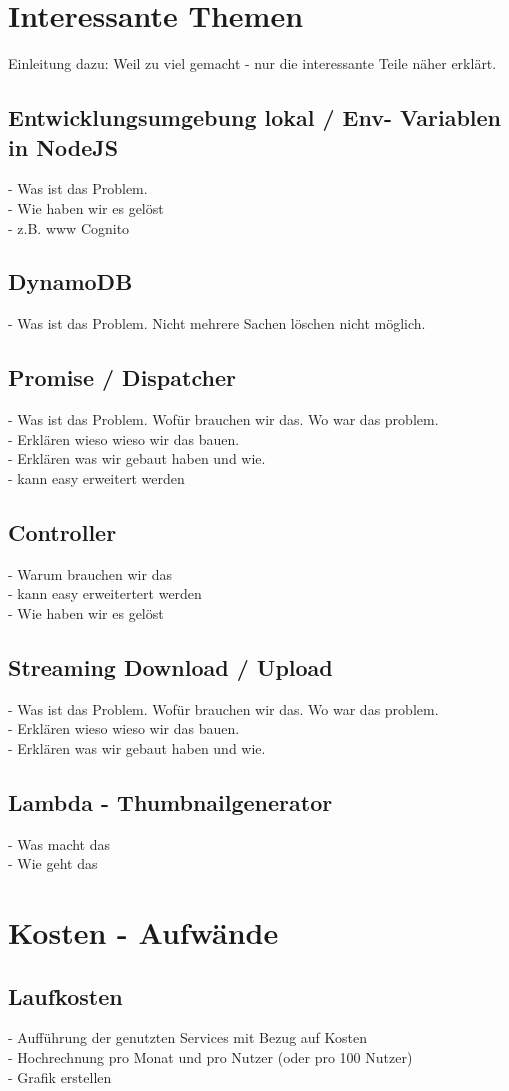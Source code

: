 \documentclass[a4paper, 12pt]{scrreprt}
\begin{document}
\chapter{Interessante Themen}
Einleitung dazu: Weil zu viel gemacht - nur die interessante Teile näher erklärt.

\section{Entwicklungsumgebung lokal / Env- Variablen in NodeJS}
- Was ist das Problem.\\ 
- Wie haben wir es gelöst\\
-  z.B. www Cognito

\section{DynamoDB}
- Was ist das Problem. Nicht mehrere Sachen löschen nicht möglich. 

\section{Promise / Dispatcher}
- Was ist das Problem. Wofür brauchen wir das. Wo war das problem.\\
- Erklären wieso wieso wir das bauen.\\
- Erklären was wir gebaut haben und wie.\\
- kann easy erweitert werden

\section{Controller}
- Warum brauchen wir das\\
- kann easy erweitertert werden\\
- Wie haben wir es gelöst

\section{Streaming Download / Upload}
- Was ist das Problem. Wofür brauchen wir das. Wo war das problem.\\
- Erklären wieso wieso wir das bauen.\\
- Erklären was wir gebaut haben und wie.

\section{Lambda - Thumbnailgenerator}
- Was macht das\\
- Wie geht das

\chapter{Kosten - Aufwände}

\section{Laufkosten}
- Aufführung der genutzten Services mit Bezug auf Kosten\\
- Hochrechnung pro Monat und pro Nutzer (oder pro 100 Nutzer) \\
- Grafik erstellen







\clearpage

%
\end{document}
